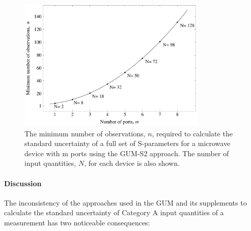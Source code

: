 \documentclass[../thesis/thesis.tex]{subfiles}
\begin{document}
\begin{refsection}
\begin{figure}
	\centering
	\includegraphics[width=0.8\textwidth]{gum_sparams.pdf}
	\caption[Plot of minimum observations for valid GUM Supplement uncertainty evaluation.]{The minimum number of observations, $n$, required to calculate the standard uncertainty of a full set of S-parameters for a microwave device with m ports using the GUM-S2 approach. The number of input quantities, $N$, for each device is also shown.}
	\label{ch3_fig_gum_sparams}
\end{figure}

\paragraph{Discussion}

The inconsistency of the approaches used in the GUM and its supplements to calculate the standard uncertainty of Category A input quantities of a measurement has two noticeable consequences:


\end{refsection}
\end{document}
